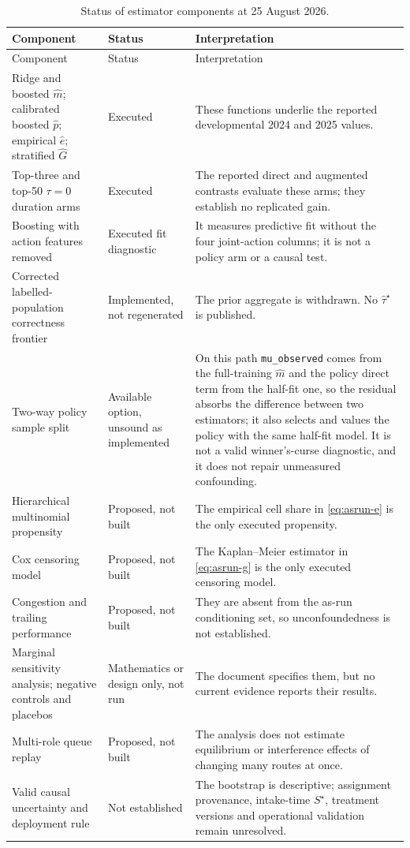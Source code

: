 \documentclass[11pt,a4paper]{article}
\theoremstyle{plain}
\theoremstyle{definition}
\theoremstyle{remark}
\newcommand{\Sstar}{S^{\star}}
\begin{document}
\begin{longtable}{p{4.2cm}p{3.0cm}p{6.8cm}}
\caption{Status of estimator components at 25 August 2026.}\label{tab:asrun-status}\\
\toprule
Component & Status & Interpretation\\
\midrule
\endfirsthead
\toprule
Component & Status & Interpretation\\
\midrule
\endhead
Ridge and boosted $\hat m$; calibrated boosted $\hat p$; empirical $\hat e$; stratified $\hat G$
& Executed & These functions underlie the reported developmental 2024 and 2025 values.\\
Top-three and top-50 $\tau=0$ duration arms & Executed & The reported direct and augmented
contrasts evaluate these arms; they establish no replicated gain.\\
Boosting with action features removed & Executed fit diagnostic & It measures predictive fit
without the four joint-action columns; it is not a policy arm or a causal test.\\
Corrected labelled-population correctness frontier & Implemented, not regenerated & The prior
aggregate is withdrawn. No $\hat\tau^\star$ is published.\\
Two-way policy sample split & Available option, unsound as implemented & On this path
\texttt{mu\_observed} comes from the full-training $\hat m$ and the policy direct term from the
half-fit one, so the residual absorbs the difference between two estimators; it also selects and
values the policy with the same half-fit model. It is not a valid winner's-curse diagnostic, and
it does not repair unmeasured confounding.\\
Hierarchical multinomial propensity & Proposed, not built & The empirical cell share in
\eqref{eq:asrun-e} is the only executed propensity.\\
Cox censoring model & Proposed, not built & The Kaplan--Meier estimator in
\eqref{eq:asrun-g} is the only executed censoring model.\\
Congestion and trailing performance & Proposed, not built & They are absent from the as-run
conditioning set, so unconfoundedness is not established.\\
Marginal sensitivity analysis; negative controls and placebos & Mathematics or design only,
not run & The document specifies them, but no current evidence reports their results.\\
Multi-role queue replay & Proposed, not built & The analysis does not estimate equilibrium or
interference effects of changing many routes at once.\\
Valid causal uncertainty and deployment rule & Not established & The bootstrap is descriptive;
assignment provenance, intake-time $\Sstar$, treatment versions and operational validation remain
unresolved.\\
\bottomrule
\end{longtable}
\end{document}
